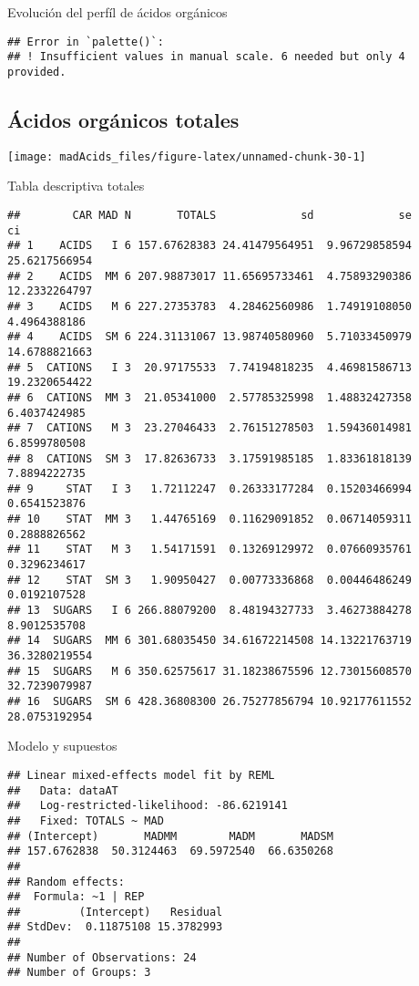 \documentclass[
]{article}
\begin{document}
Evolución del perfíl de ácidos orgánicos

\begin{verbatim}
## Error in `palette()`:
## ! Insufficient values in manual scale. 6 needed but only 4 provided.
\end{verbatim}

\subsection{Ácidos orgánicos
totales}\label{uxe1cidos-orguxe1nicos-totales}

\begin{center}\texttt{[image: madAcids\_files/figure-latex/unnamed-chunk-30-1]} \end{center}

Tabla descriptiva totales

\begin{verbatim}
##        CAR MAD N       TOTALS             sd             se            ci
## 1    ACIDS   I 6 157.67628383 24.41479564951  9.96729858594 25.6217566954
## 2    ACIDS  MM 6 207.98873017 11.65695733461  4.75893290386 12.2332264797
## 3    ACIDS   M 6 227.27353783  4.28462560986  1.74919108050  4.4964388186
## 4    ACIDS  SM 6 224.31131067 13.98740580960  5.71033450979 14.6788821663
## 5  CATIONS   I 3  20.97175533  7.74194818235  4.46981586713 19.2320654422
## 6  CATIONS  MM 3  21.05341000  2.57785325998  1.48832427358  6.4037424985
## 7  CATIONS   M 3  23.27046433  2.76151278503  1.59436014981  6.8599780508
## 8  CATIONS  SM 3  17.82636733  3.17591985185  1.83361818139  7.8894222735
## 9     STAT   I 3   1.72112247  0.26333177284  0.15203466994  0.6541523876
## 10    STAT  MM 3   1.44765169  0.11629091852  0.06714059311  0.2888826562
## 11    STAT   M 3   1.54171591  0.13269129972  0.07660935761  0.3296234617
## 12    STAT  SM 3   1.90950427  0.00773336868  0.00446486249  0.0192107528
## 13  SUGARS   I 6 266.88079200  8.48194327733  3.46273884278  8.9012535708
## 14  SUGARS  MM 6 301.68035450 34.61672214508 14.13221763719 36.3280219554
## 15  SUGARS   M 6 350.62575617 31.18238675596 12.73015608570 32.7239079987
## 16  SUGARS  SM 6 428.36808300 26.75277856794 10.92177611552 28.0753192954
\end{verbatim}

Modelo y supuestos

\begin{verbatim}
## Linear mixed-effects model fit by REML
##   Data: dataAT 
##   Log-restricted-likelihood: -86.6219141
##   Fixed: TOTALS ~ MAD 
## (Intercept)       MADMM        MADM       MADSM 
## 157.6762838  50.3124463  69.5972540  66.6350268 
## 
## Random effects:
##  Formula: ~1 | REP
##         (Intercept)   Residual
## StdDev:  0.11875108 15.3782993
## 
## Number of Observations: 24
## Number of Groups: 3
\end{verbatim}
\end{document}
